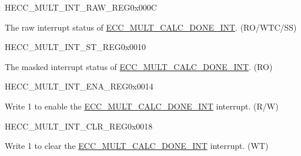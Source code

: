 \begin{register}{H}{ECC\_MULT\_INT\_RAW\_REG}{0x000C}\label{regdesc:ECCMULTINTRAWREG}
%
%
\regnewline%
\begin{regdesc}\begin{reglist}
\label{fielddesc:ECCMULTCALCDONEINTRAW}\item [ECC\_MULT\_CALC\_DONE\_INT\_RAW] The raw interrupt status of \hyperref[int:ECCMULTCALCDONEINT]{ECC\_MULT\_CALC\_DONE\_INT}. (RO/WTC/SS)
\end{reglist}\end{regdesc}
\end{register}


\begin{register}{H}{ECC\_MULT\_INT\_ST\_REG}{0x0010}\label{regdesc:ECCMULTINTSTREG}
%
%
\regnewline%
\begin{regdesc}\begin{reglist}
\label{fielddesc:ECCMULTCALCDONEINTST}\item [ECC\_MULT\_CALC\_DONE\_INT\_ST] The masked interrupt status of \hyperref[int:ECCMULTCALCDONEINT]{ECC\_MULT\_CALC\_DONE\_INT}. (RO)
\end{reglist}\end{regdesc}
\end{register}


\begin{register}{H}{ECC\_MULT\_INT\_ENA\_REG}{0x0014}\label{regdesc:ECCMULTINTENAREG}
%
%
\regnewline%
\begin{regdesc}\begin{reglist}
\label{fielddesc:ECCMULTCALCDONEINTENA}\item [ECC\_MULT\_CALC\_DONE\_INT\_ENA] Write 1 to enable the \hyperref[int:ECCMULTCALCDONEINT]{ECC\_MULT\_CALC\_DONE\_INT} interrupt. (R/W)

\end{reglist}\end{regdesc}
\end{register}


\begin{register}{H}{ECC\_MULT\_INT\_CLR\_REG}{0x0018}\label{regdesc:ECCMULTINTCLRREG}
%
%
\regnewline%
\begin{regdesc}\begin{reglist}
\label{fielddesc:ECCMULTCALCDONEINTCLR}\item [ECC\_MULT\_CALC\_DONE\_INT\_CLR] Write 1 to clear the \hyperref[int:ECCMULTCALCDONEINT]{ECC\_MULT\_CALC\_DONE\_INT} interrupt. (WT)

\end{reglist}\end{regdesc}
\end{register}


